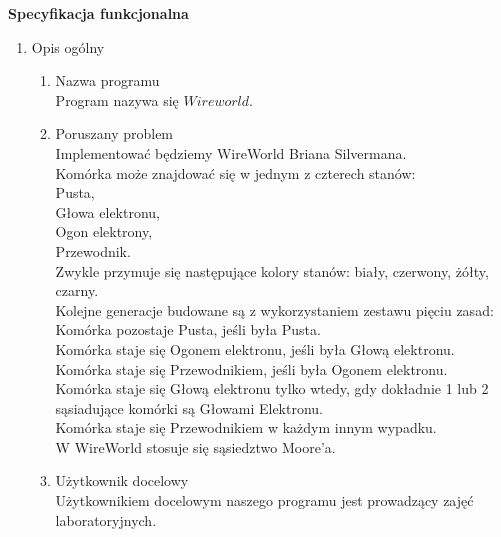\documentclass[11pt]{article}
\begin{document}
\begin{huge}
\begin{center}
\textbf{Specyfikacja funkcjonalna}
\end{center}
\end{huge}

 \renewcommand{\labelenumii}{\Roman{enumii}}
 \begin{enumerate}
 
 \item Opis ogólny
 
 \begin{enumerate}[label=\arabic{enumi}.\arabic*.]
 
 \item Nazwa programu\\
 Program nazywa się $Wireworld$.
 \item Poruszany problem\\
 Implementować będziemy WireWorld Briana Silvermana.\\
 Komórka może znajdować się w jednym z czterech stanów:\\
 Pusta,\\
 Głowa elektronu,\\
 Ogon elektrony,\\
 Przewodnik.\\
 Zwykle przymuje się następujące kolory stanów: biały, czerwony, żółty, czarny.\\
 Kolejne generacje budowane są z wykorzystaniem zestawu pięciu zasad:\\
 Komórka pozostaje Pusta, jeśli była Pusta.\\
 Komórka staje się Ogonem elektronu, jeśli była Głową elektronu.\\
 Komórka staje się Przewodnikiem, jeśli była Ogonem elektronu.\\
 Komórka staje się Głową elektronu tylko wtedy, gdy dokładnie 1 lub 2 sąsiadujące komórki są Głowami Elektronu.\\
 Komórka staje się Przewodnikiem w każdym innym wypadku.\\
 W WireWorld stosuje się sąsiedztwo Moore'a.\\
 
 \item Użytkownik docelowy\\
 Użytkownikiem docelowym naszego programu jest prowadzący zajęć laboratoryjnych.\\

 \end{enumerate}
 

\end{enumerate}
\end{document}
